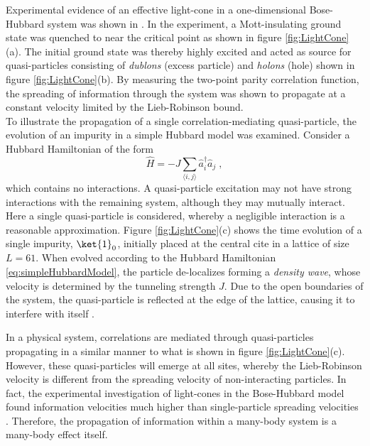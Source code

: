 Experimental evidence of an effective light-cone in a one-dimensional Bose-Hubbard system was shown in \cite{Cheneau2012}. In the experiment, a Mott-insulating ground state was quenched to near the critical point as shown in figure \ref{fig:LightCone}(a). The initial ground state was thereby highly excited and acted as source for quasi-particles consisting of \textit{dublons} (excess particle) and \textit{holons} (hole) shown in figure \ref{fig:LightCone}(b). By measuring the two-point parity correlation function, the spreading of information through the system was shown to propagate at a constant velocity limited by the Lieb-Robinson bound.\\

To illustrate the propagation of a single correlation-mediating quasi-particle, the evolution of an impurity in a simple Hubbard model was examined. Consider a Hubbard Hamiltonian of the form
\begin{equation}
	\hat{H} = - J \sum_{\langle i,j \rangle} \hat{a}_{i}^{\dag} \hat{a}_{j} \; ,
	\label{eq:simpleHubbardModel}
\end{equation} 
which contains no interactions. A quasi-particle excitation may not have strong interactions with the remaining system, although they may mutually interact. Here a single quasi-particle is considered, whereby a negligible  interaction is a reasonable approximation. Figure \ref{fig:LightCone}(c) shows the time evolution of a single impurity, $\ket{1}_{0}$, initially placed at the central cite in a lattice of size $L = 61$. When evolved according to the Hubbard Hamiltonian \eqref{eq:simpleHubbardModel}, the particle de-localizes forming a \textit{density wave}, whose velocity is determined by the tunneling strength $J$. Due to the open boundaries of the system, the quasi-particle is reflected at the edge of the lattice, causing it to interfere with itself \cite{Calabrese2006}.

In a physical system, correlations are mediated through quasi-particles propagating in a similar manner to what is shown in figure \ref{fig:LightCone}(c). However, these quasi-particles will emerge at all sites, whereby the Lieb-Robinson velocity is different from the spreading velocity of non-interacting particles. In fact, the experimental investigation of light-cones in the Bose-Hubbard model found information velocities much higher than single-particle spreading velocities \cite{Cheneau2012}. Therefore, the propagation of information within a many-body system is a many-body effect itself.



